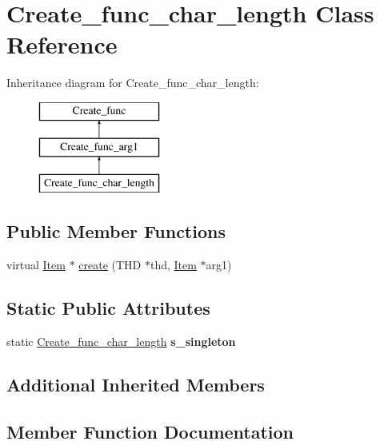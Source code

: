 \hypertarget{classCreate__func__char__length}{}\section{Create\+\_\+func\+\_\+char\+\_\+length Class Reference}
\label{classCreate__func__char__length}
Inheritance diagram for Create\+\_\+func\+\_\+char\+\_\+length\+:\begin{figure}[H]
\begin{center}
\leavevmode
\includegraphics[height=3.000000cm]{classCreate__func__char__length}
\end{center}
\end{figure}
\subsection*{Public Member Functions}
\begin{DoxyCompactItemize}
\item 
virtual \mbox{\hyperlink{classItem}{Item}} $\ast$ \mbox{\hyperlink{classCreate__func__char__length_aad463613db626527eab8aac6b7426f6a}{create}} (T\+HD $\ast$thd, \mbox{\hyperlink{classItem}{Item}} $\ast$arg1)
\end{DoxyCompactItemize}
\subsection*{Static Public Attributes}
\begin{DoxyCompactItemize}
\item 
\mbox{\label{classCreate__func__char__length_a8ae19f720ac4b664e380d91b737ebdaf}} 
static \mbox{\hyperlink{classCreate__func__char__length}{Create\+\_\+func\+\_\+char\+\_\+length}} {\bfseries s\+\_\+singleton}
\end{DoxyCompactItemize}
\subsection*{Additional Inherited Members}


\subsection{Member Function Documentation}
\mbox{\label{classCreate__func__char__length_aad463613db626527eab8aac6b7426f6a}} 
